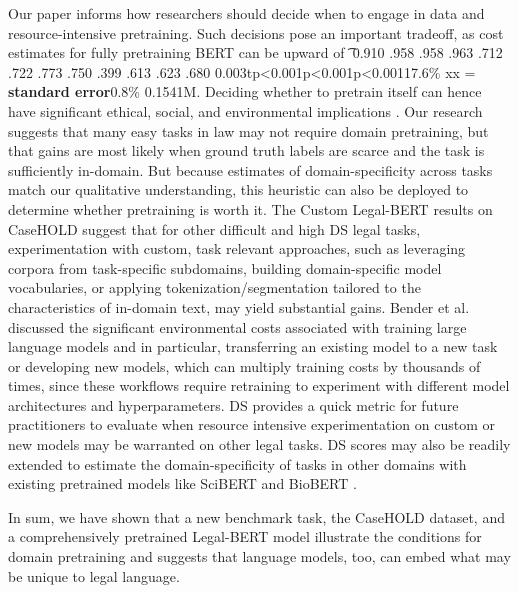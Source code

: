 \documentclass[sigconf]{acmart}
\begin{document}
Our paper informs how researchers should decide when to engage in data and resource-intensive pretraining. Such decisions pose an important tradeoff, as cost estimates for fully pretraining BERT can be upward of \t{} \times {}0.910 .958 .958 .963  .712 .722 .773 .750  .399 .613 .623 .680  \pm 0.003tp<0.001p<0.001p<0.00117.6\%  \times {}xx = \times \textbf{standard error}0.8\% \pm 0.1541M.  Deciding whether to pretrain itself can hence have  significant ethical, social, and environmental implications \cite{bender2021dangers}.  Our research suggests that many easy tasks in law may not require domain pretraining, but that gains are most likely when ground truth labels are scarce and the task is sufficiently in-domain. But because estimates of domain-specificity across tasks match our qualitative understanding, this heuristic can also be deployed to determine whether pretraining is worth it. The Custom Legal-BERT results on CaseHOLD suggest that for other difficult and high DS legal tasks, experimentation with custom, task relevant approaches, such as leveraging corpora from task-specific subdomains, building domain-specific model vocabularies, or applying tokenization/segmentation tailored to the characteristics of in-domain text, may yield substantial gains. Bender et al. \cite{bender2021dangers} discussed the significant environmental costs associated with training large language models and in particular, transferring an existing model to a new task or developing new models, which can multiply training costs by thousands of times, since these workflows require retraining to experiment with different model architectures and hyperparameters. DS provides a quick metric for future practitioners to evaluate when resource intensive experimentation on custom or new models may be warranted on other legal tasks. DS scores may also be readily extended to estimate the domain-specificity of tasks in other domains with existing pretrained models like SciBERT and BioBERT \cite{beltagy-etal-2019-scibert, lee_biobert_2019}.

In sum, we have shown that a new benchmark task, the CaseHOLD dataset, and a comprehensively pretrained Legal-BERT model illustrate the conditions for domain pretraining and suggests that language models, too, can embed what may be unique to legal language. 
\end{document}
